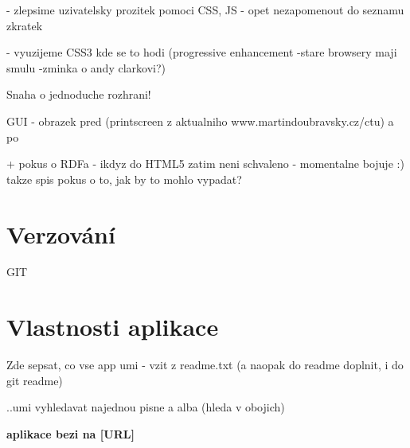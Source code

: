 - zlepsime uzivatelsky prozitek pomoci CSS, JS - opet nezapomenout do seznamu zkratek

- vyuzijeme CSS3 kde se to hodi (progressive enhancement -stare browsery maji smulu -zminka o andy clarkovi?)

Snaha o jednoduche rozhrani!

GUI - obrazek pred (printscreen z aktualniho www.martindoubravsky.cz/ctu) a po

+ pokus o RDFa - ikdyz do HTML5 zatim neni schvaleno - momentalne bojuje :) takze spis pokus o to, jak by to mohlo vypadat?

\section{Verzování}

GIT

\section{Vlastnosti aplikace}

Zde sepsat, co vse app umi - vzit z readme.txt (a naopak do readme doplnit, i do git readme)

..umi vyhledavat najednou pisne a alba (hleda v obojich)



\textbf{aplikace bezi na [URL]}